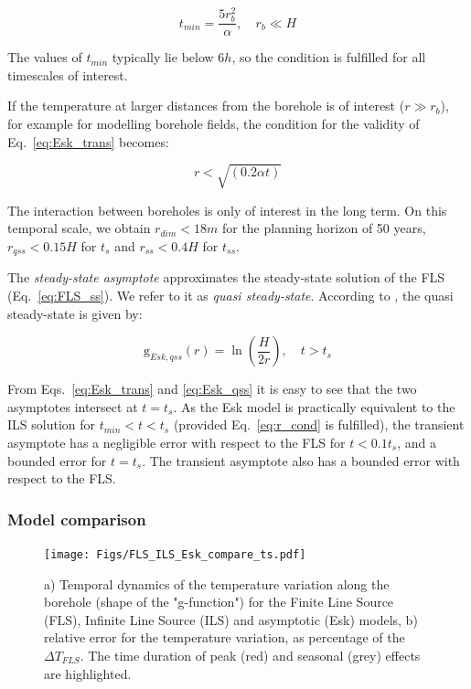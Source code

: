 \begin{equation}
    t_{min} = \frac{5 r_b^2}{\alpha}, \quad r_b \ll H
\end{equation}

The values of $t_{min}$ typically lie below $6h$, so the condition is fulfilled for all timescales of interest.

If the temperature at larger distances from the borehole is of interest ($r \gg r_b$), for example for modelling borehole fields, the condition for the validity of Eq.~\ref{eq:Esk_trans} becomes:

\begin{equation}
\label{eq:r_cond}
    r < \sqrt{(0.2 \alpha t )}
\end{equation}

The interaction between boreholes is only of interest in the long term. On this temporal scale, we obtain $r_{dim} < 18m$ for the planning horizon of 50 years, $r_{qss} < 0.15H$ for $t_s$ and $r_{ss} < 0.4H$ for $t_{ss}$.

The \textit{steady-state asymptote} approximates the steady-state solution of the FLS (Eq.~\ref{eq:FLS_ss}). We refer to it as \textit{quasi steady-state}. According to \citet{eskilson_thermal_1987}, the quasi steady-state is given by:

\begin{equation}
\label{eq:Esk_qss}
    \mathrm{g}_{Esk, qss}(r) = \ln\left(\frac{H}{2 r}\right), \quad t > t_s
\end{equation}

From Eqs.~\ref{eq:Esk_trans} and \ref{eq:Esk_qss} it is easy to see that the two asymptotes intersect at $t = t_s$.
As the Esk model is practically equivalent to the ILS solution for $t_{min} < t < t_s$ (provided Eq.~\ref{eq:r_cond} is fulfilled), the transient asymptote has a negligible error with respect to the FLS for $t < 0.1 t_s$, and a bounded error for $t = t_s$. The transient asymptote also has a bounded error with respect to the FLS.

\subsubsection{Model comparison}
\label{comparison}

\begin{figure}[t]
    \centering
    \texttt{[image: Figs/FLS\_ILS\_Esk\_compare\_ts.pdf]}
    \caption{a) Temporal dynamics of the temperature variation along the borehole (shape of the "g-function") for the Finite Line Source (FLS), Infinite Line Source (ILS) and asymptotic (Esk) models, b) relative error for the temperature variation, as percentage of the $\Delta T_{FLS}$. The time duration of peak (red) and seasonal (grey) effects are highlighted.}
    \label{fig:T_dynamics}
\end{figure}

